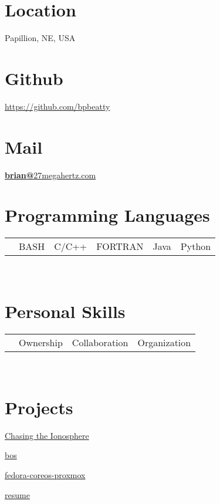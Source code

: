 \documentclass[]{src/friggeri-cv}
\begin{document}
    {}


\begin{aside}
  \section{Location}
    Papillion, NE, USA
    ~
  \section{Github}
    \href{https://github.com/bpbeatty}{https://github.com/bpbeatty}
    ~
  \section{Mail}
    \href{mailto:brian@27megahertz.com}{\textbf{brian@}27megahertz.com}
    ~
  \section{Programming Languages}
    \begin{tabular}{p{1.1cm} p{2.5cm}}
       & {BASH}

       & {C/C++}

       & {FORTRAN}

       & {Java}

       & {Python}

    \end{tabular}
    ~
  \section{Personal Skills}
    \begin{tabular}{p{1.2cm} p{2.0cm}}
       & {Ownership}

       & {Collaboration}

       & {Organization}

    \end{tabular}
    ~
  \section{Projects}
    \item[\rightarrow]\href{https://www.northropgrumman.com/space/chasing-the-ionosphere}{Chasing the Ionosphere}
    \item[\rightarrow]\href{https://github.com/bpbeatty/bos}{bos}
    \item[\rightarrow]\href{https://github.com/bpbeatty/fedora-coreos-proxmox}{fedora-coreos-proxmox}
    \item[\rightarrow]\href{https://github.com/bpbeatty/resume}{resume}
    ~

\end{aside}
\end{document}
